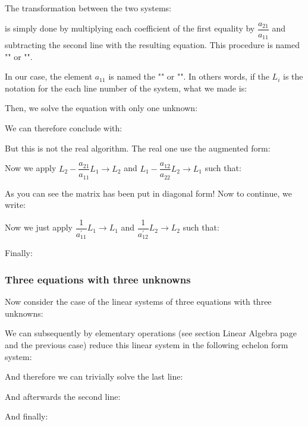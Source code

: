 		The transformation between the two systems:
		
		is simply done by multiplying each coefficient of the first equality by $\dfrac{a_{21}}{a_{11}}$ and subtracting the second line with the resulting equation. This procedure is named "" or "\label{Gaussian elimination}". 
		
		In our case, the element $a_{11}$ is named the "" or "". In others words, if the $L_i$ is the notation for the each line number of the system, what we made is:
		
		Then, we solve the equation with only one unknown:
		
		We can therefore conclude with:
		
		But this is not the real algorithm. The real one use the augmented form:
		
		 Now we apply $L_2-\dfrac{a_{21}}{a_{11}}L_1\rightarrow L_2$ and $L_1-\dfrac{a_{12}}{a_{22}}L_2 \rightarrow L_1$ such that:
		
		As you can see the matrix has been put in diagonal form!
		Now to continue, we write:
		
		
		Now we just apply $\dfrac{1}{a_{11}^{'}}L_1 \rightarrow L_1$ and  $\dfrac{1}{a_{12}^{'}}L_2 \rightarrow L_2$ such that:
		
		Finally:
		
		
		\subsubsection{Three equations with three unknowns}
	Now consider the case of the linear systems of three equations with three unknowns:
		
	We can subsequently by elementary operations (see section Linear Algebra page \pageref{linear systems} and the previous case) reduce this linear system in the following echelon form system:
		
		And therefore we can trivially solve the last line:
		
		And afterwards the second line:
		
		And finally:
		
